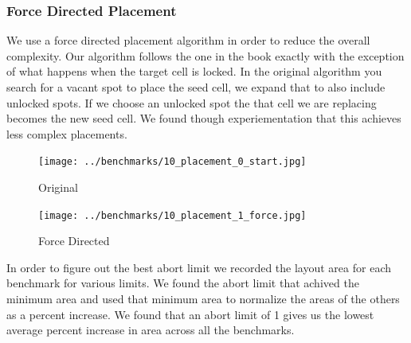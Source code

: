 \documentclass[10pt]{article}
\begin{document}
        \newpage
        \subsubsection{Force Directed Placement}

        We use a force directed placement algorithm in order to reduce the
        overall complexity. Our algorithm follows the one in the book exactly
        with the exception of what happens when the target cell is locked.  In
        the original algorithm you search for a vacant spot to place the seed
        cell, we expand that to also include unlocked spots. If we choose an
        unlocked spot the that cell we are replacing becomes the new seed cell.
        We found though experiementation that this achieves less complex
        placements.

        \begin{figure}[H]
            \centering
            \texttt{[image: ../benchmarks/10\_placement\_0\_start.jpg]}
            \caption{Original}
        \end{figure}
        \begin{figure}[H]
            \centering
            \texttt{[image: ../benchmarks/10\_placement\_1\_force.jpg]}
            \caption{Force Directed}
        \end{figure}

        In order to figure out the best abort limit we recorded the layout area
        for each benchmark for various limits. We found the abort limit that
        achived the minimum area and used that minimum area to normalize the
        areas of the others as a percent increase. We found that an abort limit
        of 1 gives us the lowest average percent increase in area across all
        the benchmarks.
\end{document}
